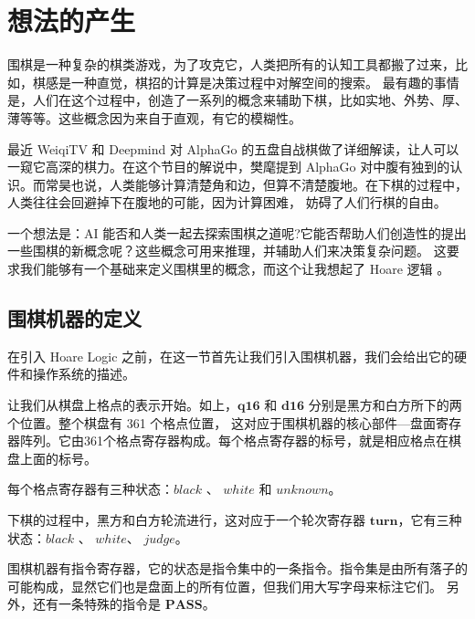\section{想法的产生}

围棋是一种复杂的棋类游戏，为了攻克它，人类把所有的认知工具都搬了过来，比如，棋感是一种直觉，棋招的计算是决策过程中对解空间的搜索。
最有趣的事情是，人们在这个过程中，创造了一系列的概念来辅助下棋，比如实地、外势、厚、薄等等。这些概念因为来自于直观，有它的模糊性。

最近 WeiqiTV 和 Deepmind 对 AlphaGo 的五盘自战棋做了详细解读，让人可以一窥它高深的棋力。在这个节目的解说中，樊麾提到 AlphaGo
对中腹有独到的认识。而常昊也说，人类能够计算清楚角和边，但算不清楚腹地。在下棋的过程中，人类往往会回避掉下在腹地的可能，因为计算困难，
妨碍了人们行棋的自由。

一个想法是：AI 能否和人类一起去探索围棋之道呢?它能否帮助人们创造性的提出一些围棋的新概念呢？这些概念可用来推理，并辅助人们来决策复杂问题。
这要求我们能够有一个基础来定义围棋里的概念，而这个让我想起了 Hoare 逻辑 。

\subsection{围棋机器的定义}

在引入 Hoare Logic 之前，在这一节首先让我们引入围棋机器，我们会给出它的硬件和操作系统的描述。

\begin{center}
\begin{psgoboard}
\end{psgoboard}
\end{center}

让我们从棋盘上格点的表示开始。如上，$\mathbf{q16}$ 和 $\mathbf{d16}$ 分别是黑方和白方所下的两个位置。整个棋盘有 361 个格点位置，
这对应于围棋机器的核心部件—盘面寄存器阵列。它由361个格点寄存器构成。每个格点寄存器的标号，就是相应格点在棋盘上面的标号。

每个格点寄存器有三种状态：$\mathit{black}$ 、 $\mathit{white}$ 和 $\mathit{unknown}$。

下棋的过程中，黑方和白方轮流进行，这对应于一个轮次寄存器 $\mathbf{turn}$，它有三种状态：$\mathit{black}$ 、 $\mathit{white}$、 $\mathit{judge}$。

围棋机器有指令寄存器，它的状态是指令集中的一条指令。指令集是由所有落子的可能构成，显然它们也是盘面上的所有位置，但我们用大写字母来标注它们。
另外，还有一条特殊的指令是 $\mathbf{PASS}$。

\setcounter{gomove}{0}
\begin{center}
    \begin{psgoboard}
    \end{psgoboard}
\end{center}

